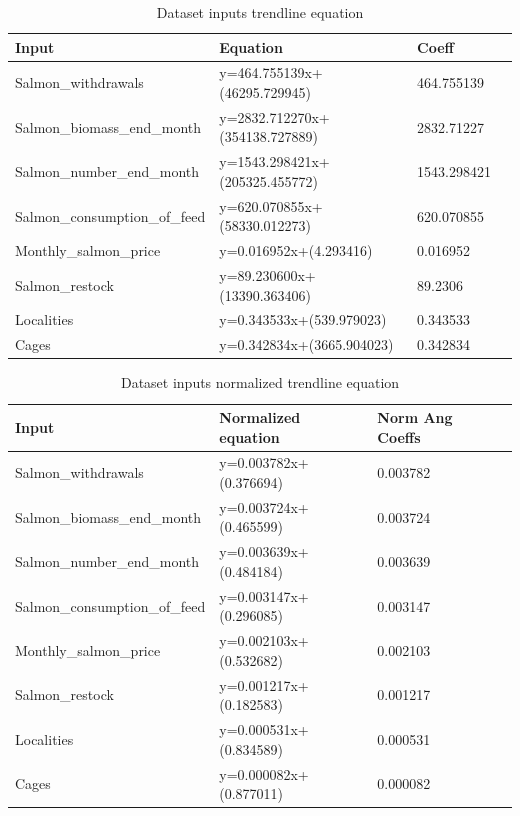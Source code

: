 \begin{table}[ht] 
	\centering
    \begin{tabular}{ | l | l | l | p{5cm} |}
        \hline
        Input 								& Equation 							& Coeff			\\ \hline
          	Salmon\_withdrawals 			& y=464.755139x+(46295.729945) 		& 464.755139 	\\ \hline
          	Salmon\_biomass\_end\_month 	& y=2832.712270x+(354138.727889) 	& 2832.71227 	\\ \hline
          	Salmon\_number\_end\_month 		& y=1543.298421x+(205325.455772)	& 1543.298421 	\\ \hline
          	Salmon\_consumption\_of\_feed 	& y=620.070855x+(58330.012273) 		& 620.070855	\\ \hline
           	Monthly\_salmon\_price 			& y=0.016952x+(4.293416) 			& 0.016952 		\\ \hline
          	Salmon\_restock 				& y=89.230600x+(13390.363406)		& 89.2306 		\\ \hline
 			Localities 						& y=0.343533x+(539.979023) 			& 0.343533		\\ \hline
  			Cages 							& y=0.342834x+(3665.904023) 		& 0.342834 		\\ \hline
    \end{tabular} 
    \caption{Dataset inputs trendline equation}
    \label{table: trendline} 
\end{table}
\begin{table}[ht] 
	\centering
    \begin{tabular}{ | l | l | l | p{5cm} |}
        \hline
        Input 							& Normalized equation 	& Norm Ang Coeffs	\\ \hline
          	Salmon\_withdrawals 		& y=0.003782x+(0.376694)& 0.003782			\\ \hline
          	Salmon\_biomass\_end\_month & y=0.003724x+(0.465599)& 0.003724			\\ \hline
          	Salmon\_number\_end\_month 	& y=0.003639x+(0.484184)& 0.003639			\\ \hline
          	Salmon\_consumption\_of\_feed & y=0.003147x+(0.296085)& 0.003147		\\ \hline
           	Monthly\_salmon\_price 		& y=0.002103x+(0.532682)& 0.002103			\\ \hline
          	Salmon\_restock 			& y=0.001217x+(0.182583)& 0.001217			\\ \hline
 			Localities 					& y=0.000531x+(0.834589)& 0.000531			\\ \hline
  			Cages 						& y=0.000082x+(0.877011)& 0.000082			\\ \hline
    \end{tabular} 
    \caption{Dataset inputs normalized trendline equation}
    \label{table: norm_trendline} 
\end{table}


